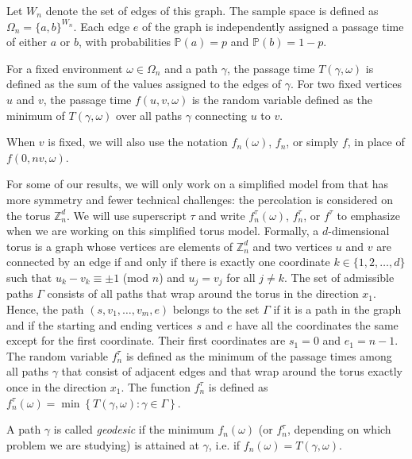 \documentclass[reqno]{amsart}
\begin{document}
Let $W_n$ denote the set of edges of this graph. The sample space is defined as $\Omega_n=\{a,b\}^{W_n}$. Each edge $e$ of the graph is independently assigned a passage time of either $a$ or $b$, with probabilities $\mathbb P(a)= p$ and $\mathbb P(b)=1-p$.  

For a fixed environment $\omega\in\Omega_n$ and a path $\gamma$, the passage time $T(\gamma,\omega)$ is defined as the sum of the values assigned to the edges of $\gamma$. For two fixed vertices $u$ and $v$, the passage time $f(u,v,\omega)$ is the random variable defined as the minimum of $T(\gamma,\omega)$ over all paths $\gamma$ connecting $u$ to $v$.

When $v$ is fixed, we will also use the notation $f_n(\omega)$, $f_n$, or simply $f$, in place of $f(0,nv,\omega)$. 
 




For some of our results, we will only work on a simplified model from \cite{benjamini2006} that has more symmetry and fewer technical challenges: the percolation is considered on the torus $\mathbb Z_{n}^d$. We will use superscript $\tau$ and write $f_n^{\tau}(\omega)$, $f_n^{\tau}$, or $f^{\tau}$ to emphasize when we are working on this simplified torus model. 
Formally, a $d$-dimensional torus is a graph whose vertices are elements of $\mathbb Z_{n}^d$ and two vertices $u$ and $v$ are connected by an edge if and only if there is exactly one coordinate $k\in\{1,2,\dots, d\}$ such that $u_k-v_k\equiv \pm1$ (mod $n$) and $u_j=v_j$ for all $j\neq k$.
The set of admissible paths $\Gamma$ consists of all paths that wrap around the torus in the direction $x_1$. Hence, the path $(s,v_1, \dots, v_m,e)$ belongs to the set $\Gamma$ if it is a path in the graph and if the starting and ending vertices $s$ and $e$ have all the coordinates the same except for the first coordinate. Their first coordinates are $s_1=0$ and $e_1=n-1$.  The random variable $f^{\tau}_n$ is defined as the minimum of the passage times among all paths $\gamma$ that consist of adjacent edges and that wrap around the torus exactly once in the direction $x_1$.  
The function $f^{\tau}_n$ is defined as 
$
f^{\tau}_n(\omega)=\min\left\{T(\gamma,\omega): \gamma \in \Gamma
\right\}.
$

A path $\gamma$ is called {\em geodesic} if the minimum $f_n(\omega)$ (or $f^{\tau}_n$, depending on which problem we are studying) is attained at $\gamma$, i.e. if $f_n(\omega)=T(\gamma,\omega)$.

 
\end{document}
